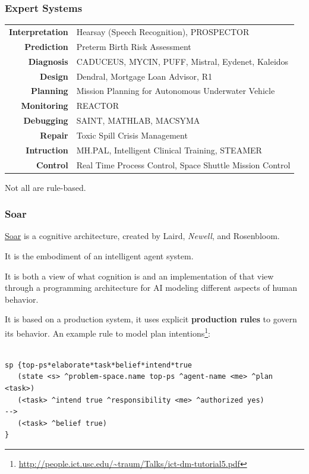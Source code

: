 \documentclass[xcolor={usenames,dvipsnames,svgnames}, compress]{beamer}
\begin{document}
\begin{frame}
  \frametitle{Expert Systems}
  \begin{table}[htbp]
    \centering
    \begin{tabular}{r l}
      \textbf{Interpretation} & Hearsay (Speech Recognition), PROSPECTOR\\
      \textbf{Prediction} & Preterm Birth Risk Assessment \\
      \textbf{Diagnosis} & CADUCEUS, MYCIN, PUFF, Mistral, Eydenet, Kaleidos\\
      \textbf{Design} & Dendral, Mortgage Loan Advisor, R1\\
      \textbf{Planning} & Mission Planning for Autonomous Underwater Vehicle\\
      \textbf{Monitoring} & REACTOR\\
      \textbf{Debugging} & SAINT, MATHLAB, MACSYMA\\
      \textbf{Repair} & Toxic Spill Crisis Management\\
      \textbf{Intruction} & MH.PAL, Intelligent Clinical Training, STEAMER\\
      \textbf{Control} & Real Time Process Control, Space Shuttle Mission Control\\
      
      
    \end{tabular}
  \end{table}
  
  Not all are rule-based.
\end{frame}

\begin{frame}
  \frametitle{Soar}
  \href{http://soar.eecs.umich.edu/}{Soar} is a cognitive architecture, created by Laird, \emph{Newell},
  and Rosenbloom.\par\bigskip
  
  It is the embodiment of an intelligent agent system.\par\bigskip
  It is both a view of what cognition is and an implementation of that
  view through a programming architecture for AI modeling different aspects of human
  behavior.\par\bigskip
  It is based on a production system, it uses explicit \textbf{production
    rules} to govern its behavior. An example rule to model plan intentions\footnote{\url{http://people.ict.usc.edu/~traum/Talks/ict-dm-tutorial5.pdf}}:
  {\tiny
\begin{verbatim}

sp {top-ps*elaborate*task*belief*intend*true
   (state <s> ^problem-space.name top-ps ^agent-name <me> ^plan <task>)
   (<task> ^intend true ^responsibility <me> ^authorized yes)
-->
   (<task> ^belief true)
}
\end{verbatim}}
\end{frame}
\end{document}
